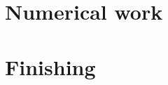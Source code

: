 \documentclass[UKenglish]{texmex/uiomasterthesis}
\begin{document}
\part{Numerical work}




\part{Finishing} %











\backmatter{}

% 



\end{document}
